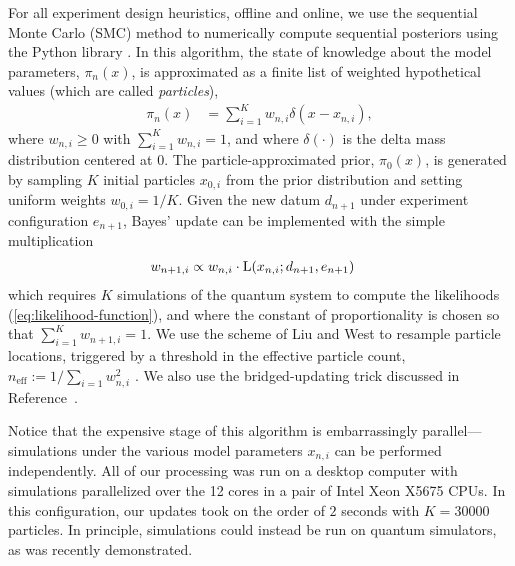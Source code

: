 \documentclass[aps,nofootinbib,twocolumn,superscriptaddress]{revtex4}
\newcommand{\mps}{x}
\newcommand{\eps}{e}
\newcommand{\data}{d}
\begin{document}
For all experiment design heuristics, offline and online,
we use the sequential Monte Carlo (SMC) \cite{doucet_tutorial_2009}
method to numerically compute sequential posteriors
using the Python library \qinfer \cite{granade_qinfer:_2017}.
In this algorithm, the state of knowledge about the model
parameters, $\pi_n(\mps)$,
is approximated as a finite list of weighted hypothetical values
(which are called \textit{particles}),
\begin{align}
    \pi_n(\mps)
        &= \sum_{i=1}^{K}w_{n,i} \delta(\mps-\mps_{n,i}),
    \label{eq:particle-approximation}
\end{align}
where $w_{n,i}\geq 0$ with $\sum_{i=1}^K w_{n,i}=1$, and where
$\delta(\cdot)$ is the delta mass distribution centered at $0$.
The particle-approximated prior, $\pi_0(\mps)$, is generated by
sampling $K$ initial particles $\mps_{0,i}$ from the prior distribution
and setting uniform weights $w_{0,i}=1/K$.
Given the new datum $\data_{n+1}$ under experiment
configuration $\eps_{n+1}$,
Bayes' update can be implemented with the simple multiplication
\begin{align}
    w_{n+1,i}
        &\propto w_{n,i}\cdot \Lhood(\mps_{n,i};\data_{n+1},\eps_{n+1})
    \label{eq:particle-update}
\end{align}
which requires $K$ simulations of the quantum system to
compute the likelihoods (\autoref{eq:likelihood-function}), and where
the constant of proportionality is chosen so that
$\sum_{i=1}^K w_{n+1,i}=1$.
We use the scheme of Liu and West \cite{liu_combined_2001}
to resample particle locations,
triggered by a threshold in the effective particle count,
$n_\text{eff}:=1/\sum_{i=1} w_{n,i}^2$ \cite{granade_qinfer:_2017}.
We also use the bridged-updating trick discussed in
Reference~\cite{hincks_statistical_2018}.

Notice that the expensive stage of this algorithm is
embarrassingly parallel---simulations under the various
model parameters $\mps_{n,i}$ can be performed independently.
All of our processing was run on a desktop computer with simulations
parallelized over the 12 cores in a pair of Intel Xeon X5675 CPUs.
In this configuration, our updates took on the order of $2$ seconds
with $K=30000$ particles.
In principle, simulations could instead be run on quantum simulators,
as was recently demonstrated\cite{wang_experimental_2017}.
\end{document}
